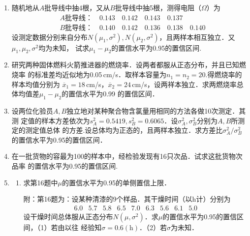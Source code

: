 \begin{enumerate}
    \item 随机地从$A$批导线中抽4根，又从$B$批导线中抽5根，测得电阻（$\Omega$）为
    \begin{equation}
        \begin{split}
            & A\mbox{批导线：} \quad  0.143 \quad 0.142 \quad 0.143 \quad 0.137\\
            & B\mbox{批导线：} \quad  0.140 \quad 0.142 \quad 0.136 \quad 0.138 \quad 0.140
        \end{split}
        \nonumber
    \end{equation}
    设测定数据分别来自分布$N(\mu_1,\sigma^2),N(\mu_2,\sigma^2)$，且两样本相互独立．又$\mu_1,\mu_2,\sigma^2$均为未知，
    试求$\mu_1-\mu_2$的置信水平为0.95的置信区间.




    \item 研究两种固体燃料火箭推进器的燃烧率．设两者都服从正态分布，并且已知燃烧率
    的标准差均近似地为0.05$\, $cm/s．取样本容量为$n_1=n_2=20$.得燃烧率的样本均值分别为
    $\overline{x}_1=18\, $cm/s，$\overline{x}_2=24\, $cm/s，设两祥本独立．求两燃烧率总体均值差$\mu_1-\mu_2$的置信水平为0.99
    的置信区间．




    \item 设两位化验员$A, B$独立地对某种聚合物含氯量用相同的方法各做10次测定．其测
    定值的样本方差依次为$s_A^2=0.5419,s_B^2=0.6065$．设$\sigma_A^2,\sigma_B^2$分别为$A,B$所测定的测定值总体
    的方差.设总体均为正态的，且两样本独立．求方差比$\sigma_A^2/\sigma_B^2$的置信水平为0.95的置信区间．


    \item 在一批货物的容最为100的样本中，经检验发现有16只次品．试求这批货物次品率
    的置信水平为0.95的置信区间.




    \item \begin{enumerate}
        \item 求第16题中$\mu$的置信水平为0.95的单侧置信上限．
        
        {\kaishu 附：第16题为：设某种清漆的9个样品．其干燥时间（以h计）分别为
        $$\begin{array}{ccccccccc}
            6.0 & 5.7 & 5.8 & 6.5 & 7.0 & 6.3 & 5.6 & 6.1 & 5.0
        \end{array}$$
        设干燥时间总体服从正态分布$N(\mu,\sigma^2)$．求$\mu$的置信水平为0.95的置信区间，（1）若由以往
        经验知$\sigma=0.6(\mathrm{h})$．（2）若$\sigma$为未知．}


\end{enumerate}
\end{enumerate}
